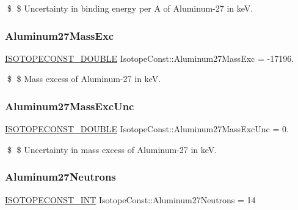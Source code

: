 \$ \$ Uncertainty in binding energy per A of Aluminum-\/27 in keV. \mbox{\label{group___isotope_const-_aluminum-_al27_ga844cb2a7dec51cfde46a1913274e6197}} 
\subsubsection{\texorpdfstring{Aluminum27\+Mass\+Exc}{Aluminum27MassExc}}
{\footnotesize\ttfamily \mbox{\hyperlink{group___isotope_const-_macros_ga8f45a7272ce02c0b4c65c44636ed719a}{I\+S\+O\+T\+O\+P\+E\+C\+O\+N\+S\+T\+\_\+\+D\+O\+U\+B\+LE}} Isotope\+Const\+::\+Aluminum27\+Mass\+Exc = -\/17196.}

\$ \$ Mass excess of Aluminum-\/27 in keV. \mbox{\label{group___isotope_const-_aluminum-_al27_ga75847cfca9ed48917eca2500216141b9}} 
\subsubsection{\texorpdfstring{Aluminum27\+Mass\+Exc\+Unc}{Aluminum27MassExcUnc}}
{\footnotesize\ttfamily \mbox{\hyperlink{group___isotope_const-_macros_ga8f45a7272ce02c0b4c65c44636ed719a}{I\+S\+O\+T\+O\+P\+E\+C\+O\+N\+S\+T\+\_\+\+D\+O\+U\+B\+LE}} Isotope\+Const\+::\+Aluminum27\+Mass\+Exc\+Unc = 0.}

\$ \$ Uncertainty in mass excess of Aluminum-\/27 in keV. \mbox{\label{group___isotope_const-_aluminum-_al27_ga31e6e90dbeca94a5b2ed8e8935a1dfcc}} 
\subsubsection{\texorpdfstring{Aluminum27\+Neutrons}{Aluminum27Neutrons}}
{\footnotesize\ttfamily \mbox{\hyperlink{group___isotope_const-_macros_ga5f18360b3e99483a35c32d789e62621c}{I\+S\+O\+T\+O\+P\+E\+C\+O\+N\+S\+T\+\_\+\+I\+NT}} Isotope\+Const\+::\+Aluminum27\+Neutrons = 14}


